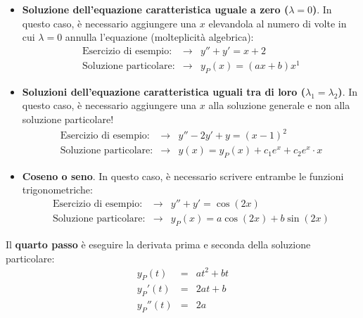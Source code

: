 \documentclass[a4paper]{article}
\begin{document}
\begin{mdframed}
\begin{itemize}
			\item \textbf{Soluzione dell'equazione caratteristica uguale a zero ($\lambda = 0$)}. In questo caso, è necessario aggiungere una $x$ elevandola al numero di volte in cui $\lambda = 0$ annulla l'equazione (molteplicità algebrica):
			\begin{equation*}
				\begin{array}{rcl}
					\text{Esercizio di esempio:} &\longrightarrow& y''+y' = x+2 \\ [1em]
					\text{Soluzione particolare:} &\longrightarrow& y_{P}\left(x\right) = \left(ax+b\right) x^{1}
				\end{array}
			\end{equation*}

			\item \textbf{Soluzioni dell'equazione caratteristica uguali tra di loro ($\lambda_{1} = \lambda_{2}$)}. In questo caso, è necessario aggiungere una $x$ alla soluzione generale e non alla soluzione particolare!
			\begin{equation*}
				\begin{array}{rcl}
					\text{Esercizio di esempio:} &\longrightarrow& y'' - 2y' + y = \left(x-1\right)^{2} \\ [1em]
					\text{Soluzione particolare:} &\longrightarrow& y\left(x\right) = y_{P}\left(x\right) + c_{1} e^{x} + c_{2} e^{x} \cdot x
				\end{array}
			\end{equation*}

			\item \textbf{Coseno o seno}. In questo caso, è necessario scrivere entrambe le funzioni trigonometriche:
			\begin{equation*}
				\begin{array}{rcl}
					\text{Esercizio di esempio:} &\longrightarrow& y''+y' = \cos\left(2x\right) \\ [1em]
					\text{Soluzione particolare:} &\longrightarrow& y_{P}\left(x\right) = a \cos\left(2x\right) + b \sin\left(2x\right)
				\end{array}
			\end{equation*}
		\end{itemize}
	\end{mdframed}

	\noindent
	Il \textbf{quarto passo} è eseguire la derivata prima e seconda della soluzione particolare:
	\begin{equation*}
		\begin{array}{rcl}
			y_{P}\left(t\right) &=& at^{2} + bt \\
			y_{P}'\left(t\right) &=& 2at + b\\
			y_{P}''\left(t\right) &=& 2a
		\end{array}
	\end{equation*}\newpage
\end{document}
